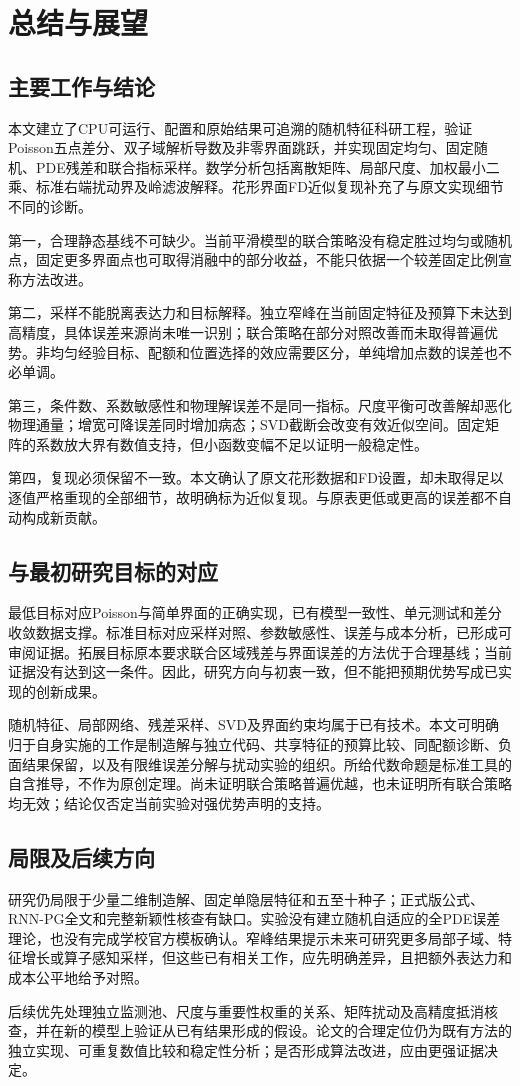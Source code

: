 \chapter{总结与展望}
\section{主要工作与结论}
本文建立了CPU可运行、配置和原始结果可追溯的随机特征科研工程，验证Poisson五点差分、双子域解析导数及非零界面跳跃，并实现固定均匀、固定随机、PDE残差和联合指标采样。数学分析包括离散矩阵、局部尺度、加权最小二乘、标准右端扰动界及岭滤波解释。花形界面FD近似复现补充了与原文实现细节不同的诊断。

第一，合理静态基线不可缺少。当前平滑模型的联合策略没有稳定胜过均匀或随机点，固定更多界面点也可取得消融中的部分收益，不能只依据一个较差固定比例宣称方法改进。

第二，采样不能脱离表达力和目标解释。独立窄峰在当前固定特征及预算下未达到高精度，具体误差来源尚未唯一识别；联合策略在部分对照改善而未取得普遍优势。非均匀经验目标、配额和位置选择的效应需要区分，单纯增加点数的误差也不必单调。

第三，条件数、系数敏感性和物理解误差不是同一指标。尺度平衡可改善解却恶化物理通量；增宽可降误差同时增加病态；SVD截断会改变有效近似空间。固定矩阵的系数放大界有数值支持，但小函数变幅不足以证明一般稳定性。

第四，复现必须保留不一致。本文确认了原文花形数据和FD设置，却未取得足以逐值严格重现的全部细节，故明确标为近似复现。与原表更低或更高的误差都不自动构成新贡献。

\section{与最初研究目标的对应}
最低目标对应Poisson与简单界面的正确实现，已有模型一致性、单元测试和差分收敛数据支撑。标准目标对应采样对照、参数敏感性、误差与成本分析，已形成可审阅证据。拓展目标原本要求联合区域残差与界面误差的方法优于合理基线；当前证据没有达到这一条件。因此，研究方向与初衷一致，但不能把预期优势写成已实现的创新成果。

随机特征、局部网络、残差采样、SVD及界面约束均属于已有技术。本文可明确归于自身实施的工作是制造解与独立代码、共享特征的预算比较、同配额诊断、负面结果保留，以及有限维误差分解与扰动实验的组织。所给代数命题是标准工具的自含推导，不作为原创定理。尚未证明联合策略普遍优越，也未证明所有联合策略均无效；结论仅否定当前实验对强优势声明的支持。

\section{局限及后续方向}
研究仍局限于少量二维制造解、固定单隐层特征和五至十种子；正式版公式、RNN-PG全文和完整新颖性核查有缺口。实验没有建立随机自适应的全PDE误差理论，也没有完成学校官方模板确认。窄峰结果提示未来可研究更多局部子域、特征增长或算子感知采样，但这些已有相关工作\cite{ag,christoffel,schwarzpreprint}，应先明确差异，且把额外表达力和成本公平地给予对照。

后续优先处理独立监测池、尺度与重要性权重的关系、矩阵扰动及高精度抵消核查，并在新的模型上验证从已有结果形成的假设。论文的合理定位仍为既有方法的独立实现、可重复数值比较和稳定性分析；是否形成算法改进，应由更强证据决定。
